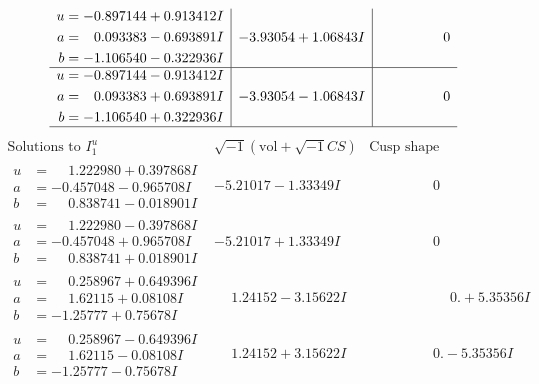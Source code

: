\documentclass[1p]{elsarticle_modified}
\theoremstyle{definition}
\newcommand{\I}{\sqrt{-1}}
\begin{document}
$$\begin{array}{c|c|c}
\begin{aligned}
u &= -0.897144 + 0.913412 I \\
a &= \phantom{-}0.093383 - 0.693891 I \\
b &= -1.106540 - 0.322936 I\end{aligned}
 & -3.93054 + 1.06843 I & \phantom{-0.000000 } 0 \\ \hline\begin{aligned}
u &= -0.897144 - 0.913412 I \\
a &= \phantom{-}0.093383 + 0.693891 I \\
b &= -1.106540 + 0.322936 I\end{aligned}
 & -3.93054 - 1.06843 I & \phantom{-0.000000 } 0\\
 \hline 
 \end{array}$$\newpage$$\begin{array}{c|c|c}  
\text{Solutions to }I^u_{1}& \I (\text{vol} + \sqrt{-1}CS) & \text{Cusp shape}\\
 \hline 
\begin{aligned}
u &= \phantom{-}1.222980 + 0.397868 I \\
a &= -0.457048 - 0.965708 I \\
b &= \phantom{-}0.838741 - 0.018901 I\end{aligned}
 & -5.21017 - 1.33349 I & \phantom{-0.000000 } 0 \\ \hline\begin{aligned}
u &= \phantom{-}1.222980 - 0.397868 I \\
a &= -0.457048 + 0.965708 I \\
b &= \phantom{-}0.838741 + 0.018901 I\end{aligned}
 & -5.21017 + 1.33349 I & \phantom{-0.000000 } 0 \\ \hline\begin{aligned}
u &= \phantom{-}0.258967 + 0.649396 I \\
a &= \phantom{-}1.62115 + 0.08108 I \\
b &= -1.25777 + 0.75678 I\end{aligned}
 & \phantom{-}1.24152 - 3.15622 I & \phantom{-0.000000 -}0. + 5.35356 I \\ \hline\begin{aligned}
u &= \phantom{-}0.258967 - 0.649396 I \\
a &= \phantom{-}1.62115 - 0.08108 I \\
b &= -1.25777 - 0.75678 I\end{aligned}
 & \phantom{-}1.24152 + 3.15622 I & \phantom{-0.000000 } 0. - 5.35356 I \\ \hline\begin{aligned}

\end{aligned}
\end{array}$$
\end{document}
